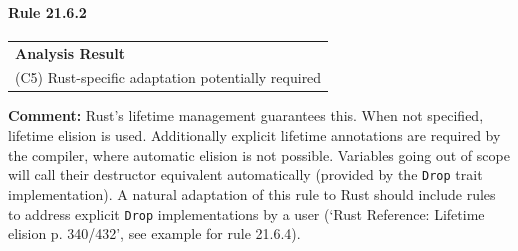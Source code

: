 \paragraph{Rule 21.6.2}
\begin{longtable}{p{13cm}}
\textbf{Analysis Result} \\
(C5) Rust-specific adaptation potentially required \\
\end{longtable}
\textbf{Comment:} Rust's lifetime management guarantees this. When not specified, lifetime elision is used. Additionally explicit lifetime annotations are required by the compiler, where automatic elision is not possible. Variables going out of scope will call their destructor equivalent automatically (provided by the \texttt{Drop} trait implementation). A natural adaptation of this rule to Rust should include rules to address explicit \texttt{Drop} implementations by a user (`Rust Reference: Lifetime elision p. 340/432', see example for rule 21.6.4). \\
